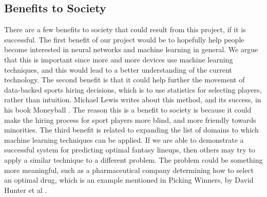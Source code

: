 \subsection{Benefits to Society}
There are a few benefits to society that could result from this project, if it is successful. The first benefit of our project would be to hopefully help people become interested in neural networks and machine learning in general. We argue that this is important since more and more devices use machine learning techniques, and this would lead to a better understanding of the current technology. The second benefit is that it could help further the movement of data-backed sports hiring decisions, which is to use statistics for selecting players, rather than intuition. Michael Lewis writes about this method, and its success, in his book Moneyball \cite{moneyball}. The reason this is a benefit to society is because it could make the hiring process for sport players more blind, and more friendly towards minorities. The third benefit is related to expanding the list of domains to which machine learning techniques can be applied. If we are able to demonstrate a successful system for predicting optimal fantasy lineups, then others may try to apply a similar technique to a different problem. The problem could be something more meaningful, such as a pharmaceutical company determining how to select an optimal drug, which is an example mentioned in Picking Winners, by David Hunter et al \cite{picking_winners}.